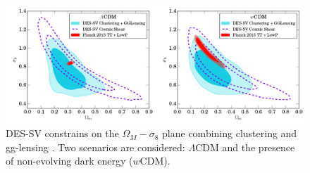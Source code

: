 \begin{figure}
\includegraphics[width=\textwidth]{./Pictures/des_lcdm.png}
\caption{DES-SV constrains on the $\Omega_M-\sigma_8$ plane combining clustering and gg-lensing \cite{2017MNRAS.464.4045K}. Two scenarios are considered: $\Lambda$CDM and the presence of non-evolving dark energy ($w$CDM).}
\label{fig:des_lcdm}
\end{figure}